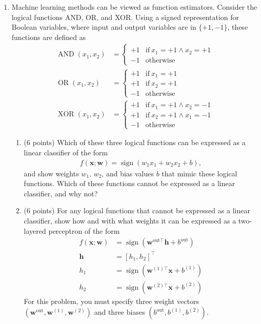 \documentclass[10pt]{article}
\newcommand{\bx}{{\boldsymbol x}}
\newcommand{\bh}{{\boldsymbol h}}
\newcommand{\bw}{{\boldsymbol w}}
\DeclareMathOperator*{\AND}{AND}
\DeclareMathOperator*{\OR}{OR}
\DeclareMathOperator*{\XOR}{XOR}
\DeclareMathOperator*{\sign}{sign}
\begin{document}
\begin{enumerate}

\item Machine learning methods can be viewed as function estimators. Consider the logical functions AND, OR, and XOR. Using a signed representation for Boolean variables, where input and output variables are in $\{+1, -1\}$, these functions are defined as
\begin{align}
\AND(x_1, x_2) &= \begin{cases}
+1 & \textrm{if}~ x_1 = +1 \wedge x_2 = +1\\
-1 & \textrm{otherwise}
\end{cases}\\
\OR(x_1, x_2) &= \begin{cases}
+1 & \textrm{if}~ x_1 = +1\\
+1 & \textrm{if}~ x_2 = +1\\
-1 & \textrm{otherwise}
\end{cases}\\
\XOR(x_1, x_2) &= \begin{cases}
+1 & \textrm{if}~ x_1 = +1 \wedge x_2 = -1\\
+1 & \textrm{if}~ x_2 = +1 \wedge x_1 = -1\\
-1 & \textrm{otherwise}
\end{cases}
\end{align}

\begin{enumerate}

\item (6 points) Which of these three logical functions can be expressed as a linear classifier of the form
\begin{align}
f(\bx; \bw) = \sign(w_1 x_1 + w_2 x_2 + b),
\end{align}
and show weights $w_1$, $w_2$, and bias values $b$ that mimic these logical functions. Which of these functions cannot be expressed as a linear classifier, and why not?

\item (6 points) For any logical functions that cannot be expressed as a linear classifier, show how and with what weights it can be expressed as a two-layered perceptron of the form
\begin{align}
f(\bx; \bw) &= \sign(\bw^{\mathrm{out}\top} \bh + b^{\mathrm{out}})\\
\bh &= [h_1, h_2]^\top\\
h_1 &= \sign(\bw^{(1)\top} \bx + b^{(1)})\\
h_2 &= \sign(\bw^{(2)\top} \bx + b^{(2)})
\end{align}
For this problem, you must specify three weight vectors $(\bw^{\mathrm{out}}, \bw^{(1)}, \bw^{(2)})$ and three biases $(b^{\mathrm{out}}, b^{(1)}, b^{(2)})$.

\end{enumerate}

\end{enumerate}
\end{document}
